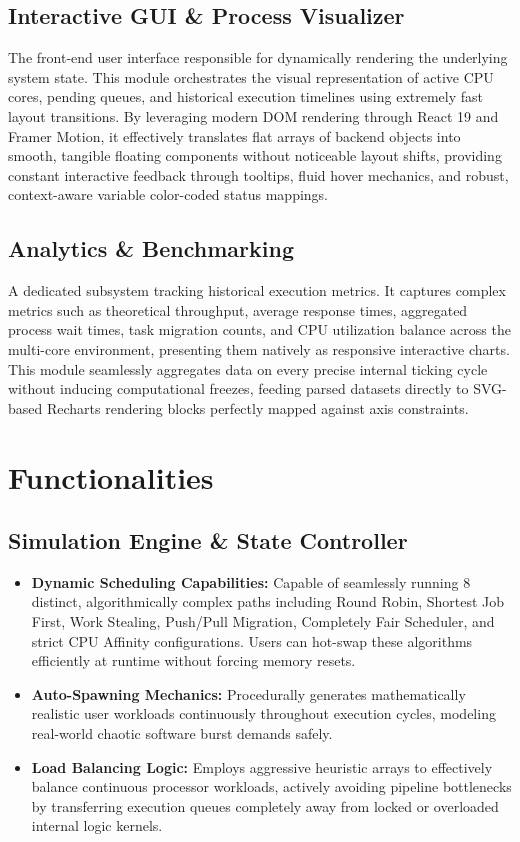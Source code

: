 \documentclass[a4paper]{article}
\begin{document}
\subsection{Interactive GUI \& Process Visualizer}
The front-end user interface responsible for dynamically rendering the underlying system state. This module orchestrates the visual representation of active CPU cores, pending queues, and historical execution timelines using extremely fast layout transitions. By leveraging modern DOM rendering through React 19 and Framer Motion, it effectively translates flat arrays of backend objects into smooth, tangible floating components without noticeable layout shifts, providing constant interactive feedback through tooltips, fluid hover mechanics, and robust, context-aware variable color-coded status mappings.

\subsection{Analytics \& Benchmarking}
A dedicated subsystem tracking historical execution metrics. It captures complex metrics such as theoretical throughput, average response times, aggregated process wait times, task migration counts, and CPU utilization balance across the multi-core environment, presenting them natively as responsive interactive charts. This module seamlessly aggregates data on every precise internal ticking cycle without inducing computational freezes, feeding parsed datasets directly to SVG-based Recharts rendering blocks perfectly mapped against axis constraints.

\section{Functionalities}

\subsection{Simulation Engine \& State Controller}
\begin{itemize}[noitemsep]
    \item \textbf{Dynamic Scheduling Capabilities:} Capable of seamlessly running 8 distinct, algorithmically complex paths including Round Robin, Shortest Job First, Work Stealing, Push/Pull Migration, Completely Fair Scheduler, and strict CPU Affinity configurations. Users can hot-swap these algorithms efficiently at runtime without forcing memory resets.
    \item \textbf{Auto-Spawning Mechanics:} Procedurally generates mathematically realistic user workloads continuously throughout execution cycles, modeling real-world chaotic software burst demands safely.
    \item \textbf{Load Balancing Logic:} Employs aggressive heuristic arrays to effectively balance continuous processor workloads, actively avoiding pipeline bottlenecks by transferring execution queues completely away from locked or overloaded internal logic kernels.
\end{itemize}
\end{document}
